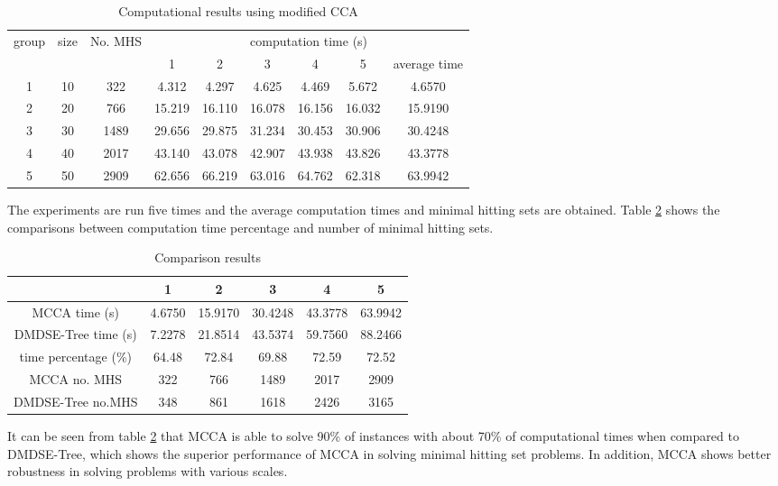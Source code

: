\begin{table}[h!]
	\begin{center}
		\caption{Computational results using modified CCA}
		\label{tab:tab2}
		\begin{tabular}{ccccccccc}
			\hline
			\multirow{2}{*}{group} & \multirow{2}{*}{size} & \multirow{2}{*}{No. MHS} & \multicolumn{6}{c}{computation time (s)} \\
			\cline{4-9}
			& & & 1 & 2 & 3 & 4 &5 & average time \\
			\hline 
			1 & 10 & 322  &  4.312 & 4.297   &  4.625 & 4.469  & 5.672   & 4.6570   \\
			2 & 20 & 766  & 15.219 &16.110   & 16.078 & 16.156 & 16.032  & 15.9190  \\
			3 & 30 & 1489 & 29.656 & 29.875  & 31.234 & 30.453 & 30.906  & 30.4248  \\
			4 & 40 & 2017 & 43.140 &  43.078 & 42.907 & 43.938 &  43.826 & 43.3778  \\
			5 & 50 & 2909 & 62.656 &  66.219 & 63.016 & 64.762 & 62.318  & 63.9942  \\
			\hline
		\end{tabular}
	\end{center}
\end{table}


The experiments are run five times and the average computation times and minimal hitting sets are obtained.
Table \ref{tab:tab3} shows the comparisons between computation time percentage and number of minimal hitting sets.

\begin{table}[h!]
	\begin{center}
		\caption{Comparison results}
		\label{tab:tab3}
		\begin{tabular}{cccccc}
			\hline
			& 1 & 2 & 3 &4 & 5 \\
			\hline
			MCCA time (s)        & 4.6750 & 15.9170 & 30.4248 & 43.3778 & 63.9942 \\
			DMDSE-Tree time (s)  & 7.2278 & 21.8514 & 43.5374 & 59.7560 & 88.2466 \\
			time percentage (\%) & 64.48  & 72.84   & 69.88   & 72.59   &  72.52  \\
			MCCA no. MHS         & 322    &  766    &  1489   & 2017    & 2909  \\
			DMDSE-Tree no.MHS    & 348    & 861     & 1618    & 2426    & 3165 \\
			\hline
		\end{tabular}
	\end{center}
\end{table}


It can be seen from table \ref{tab:tab3} that MCCA is able to solve 90\% of instances with about 70\% of computational times when compared to DMDSE-Tree, which shows the superior performance of MCCA in solving minimal hitting set problems.
In addition, MCCA shows better robustness in solving problems with various scales.